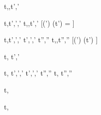 
  {t,\sigma,\delta \fix t',\sigma'}

  {t,\sigma \normalise t',\sigma',\delta'}
  {t,\sigma,\delta \fix t',\sigma'}
  [(\delta \cup \delta') \cap \Watching(t') = \nothing]

  {t,\sigma \normalise t',\sigma',\delta' \Quad
   t',\sigma',\delta' \fix t'',\sigma''}
  {t,\sigma,\delta \fix t'',\sigma''}
  [(\delta \cup \delta') \cap \Watching(t') \neq \nothing]


  {t,\sigma {} t',\sigma'}


  {t,\sigma {} t',\sigma',\delta' \Quad
   t',\sigma',\delta' \fix t'',\sigma''}
  {t,\sigma {} t'',\sigma''}



  {t,\sigma \extract {}}

  {t,\sigma \simulate {}}
